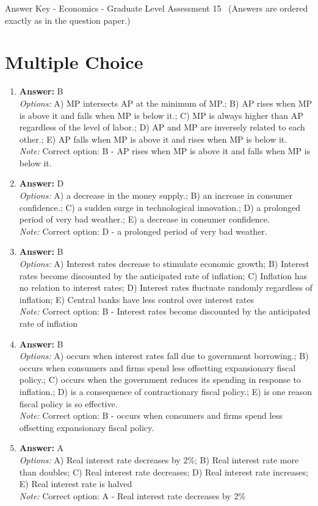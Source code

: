 \documentclass[12pt]{article}
\begin{document}
\begin{center}
Answer Key - Economics - Graduate Level Assessment 15 \
\small (Answers are ordered exactly as in the question paper.)
\end{center}

\section*{Multiple Choice}
\begin{enumerate}[label=\arabic*.]
\item \textbf{Answer:} B
\\ \textit{Options:} A) MP intersects AP at the minimum of MP.; B) AP rises when MP is above it and falls when MP is below it.; C) MP is always higher than AP regardless of the level of labor.; D) AP and MP are inversely related to each other.; E) AP falls when MP is above it and rises when MP is below it.
\\ \textit{Note:} Correct option: B - AP rises when MP is above it and falls when MP is below it.
\item \textbf{Answer:} D
\\ \textit{Options:} A) a decrease in the money supply.; B) an increase in consumer confidence.; C) a sudden surge in technological innovation.; D) a prolonged period of very bad weather.; E) a decrease in consumer confidence.
\\ \textit{Note:} Correct option: D - a prolonged period of very bad weather.
\item \textbf{Answer:} B
\\ \textit{Options:} A) Interest rates decrease to stimulate economic growth; B) Interest rates become discounted by the anticipated rate of inflation; C) Inflation has no relation to interest rates; D) Interest rates fluctuate randomly regardless of inflation; E) Central banks have less control over interest rates
\\ \textit{Note:} Correct option: B - Interest rates become discounted by the anticipated rate of inflation
\item \textbf{Answer:} B
\\ \textit{Options:} A) occurs when interest rates fall due to government borrowing.; B) occurs when consumers and firms spend less offsetting expansionary fiscal policy.; C) occurs when the government reduces its spending in response to inflation.; D) is a consequence of contractionary fiscal policy.; E) is one reason fiscal policy is so effective.
\\ \textit{Note:} Correct option: B - occurs when consumers and firms spend less offsetting expansionary fiscal policy.
\item \textbf{Answer:} A
\\ \textit{Options:} A) Real interest rate decreases by 2\%; B) Real interest rate more than doubles; C) Real interest rate decreases; D) Real interest rate increases; E) Real interest rate is halved
\\ \textit{Note:} Correct option: A - Real interest rate decreases by 2\%
\end{enumerate}
\end{document}
